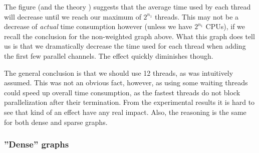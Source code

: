 \documentclass[a4paper]{article}
\begin{document}
\begin{center}
\end{center}

The figure (and the theory \cite{cov_pack}) suggests that the average time used by each thread will decrease until we reach our maximum of $2^{n_1}$ threads. This may not be a decrease of \emph{actual} time consumption however (unless we have $2^{n_1}$ CPUs), if we recall the conclusion for the non-weighted graph above. What this graph does tell us is that we dramatically decrease the time used for each thread when adding the first few parallel channels. The effect quickly diminishes though.

The general conclusion is that we should use 12 threads, as was intuitively assumed. This was not an obvious fact, however, as using some waiting threads could speed up overall time consumption, as the fastest threads do not block parallelization after their termination. From the experimental results it is hard to see that kind of an effect have any real impact. Also, the reasoning is the same for both dense and sparse graphs.



\begin{center}
\end{center}

\subsubsection{''Dense'' graphs}
\end{document}
